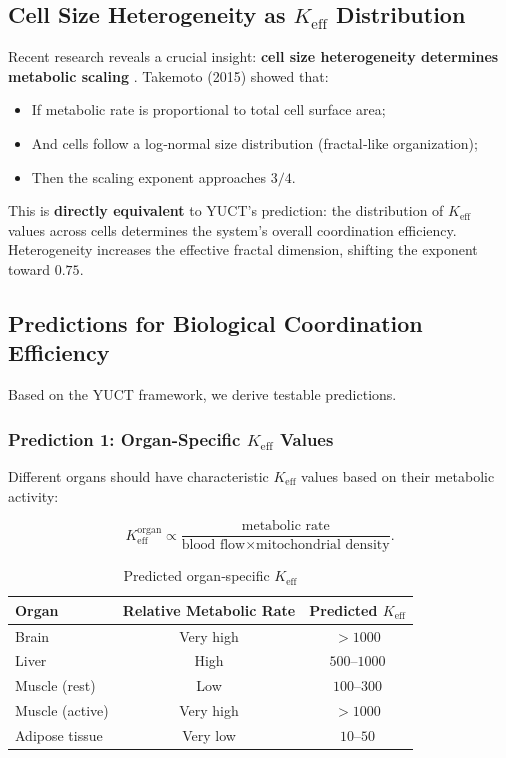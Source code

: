 \documentclass[12pt]{article}
\newcommand{\Keff}{K_{\mathrm{eff}}}
\begin{document}
	\subsection{Cell Size Heterogeneity as \(\Keff\) Distribution}
	
	Recent research reveals a crucial insight: \textbf{cell size heterogeneity determines metabolic scaling} \cite{Takemoto2015}. Takemoto (2015) showed that:
	\begin{itemize}
		\item If metabolic rate is proportional to total cell surface area;
		\item And cells follow a log‑normal size distribution (fractal‑like organization);
		\item Then the scaling exponent approaches \(3/4\).
	\end{itemize}
	This is \textbf{directly equivalent} to YUCT's prediction: the distribution of \(\Keff\) values across cells determines the system's overall coordination efficiency. Heterogeneity increases the effective fractal dimension, shifting the exponent toward \(0.75\).
	
	\subsection{Predictions for Biological Coordination Efficiency}
	
	Based on the YUCT framework, we derive testable predictions.
	
	\subsubsection{Prediction 1: Organ-Specific \(\Keff\) Values}
	
	Different organs should have characteristic \(\Keff\) values based on their metabolic activity:
	
	\begin{equation}
		\Keff^{\text{organ}} \propto \frac{\text{metabolic rate}}{\text{blood flow} \times \text{mitochondrial density}}.
	\end{equation}
	
	\begin{table}[htbp]
		\centering
		\caption{Predicted organ‑specific \(K_{\mathrm{eff}}\)}
		\label{tab:organ-keff}
		\begin{tabular}{lcc}
			\toprule
			\textbf{Organ} & \textbf{Relative Metabolic Rate} & \textbf{Predicted \(K_{\mathrm{eff}}\)} \\
			\midrule
			Brain      & Very high   & \(>1000\) \\
			Liver      & High        & \(500\)–\(1000\) \\
			Muscle (rest) & Low     & \(100\)–\(300\) \\
			Muscle (active) & Very high & \(>1000\) \\
			Adipose tissue & Very low & \(10\)–\(50\) \\
			\bottomrule
		\end{tabular}
	\end{table}
	
\end{document}
